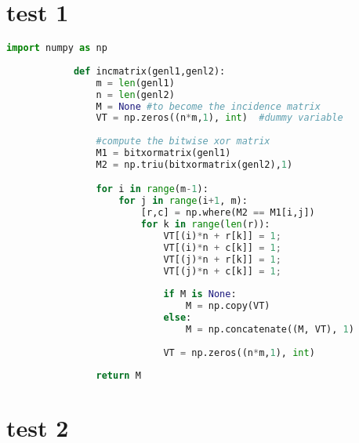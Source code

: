 \usepackage{listings}


	\usepackage{listings}
	\usepackage{color}





	\lstlistoflisting


	\section{test 1}

		\begin{lstlisting}[language=Python, caption=Python example]
			import numpy as np
				
			def incmatrix(genl1,genl2):
				m = len(genl1)
				n = len(genl2)
				M = None #to become the incidence matrix
				VT = np.zeros((n*m,1), int)  #dummy variable
				
				#compute the bitwise xor matrix
				M1 = bitxormatrix(genl1)
				M2 = np.triu(bitxormatrix(genl2),1) 

				for i in range(m-1):
					for j in range(i+1, m):
						[r,c] = np.where(M2 == M1[i,j])
						for k in range(len(r)):
							VT[(i)*n + r[k]] = 1;
							VT[(i)*n + c[k]] = 1;
							VT[(j)*n + r[k]] = 1;
							VT[(j)*n + c[k]] = 1;
							
							if M is None:
								M = np.copy(VT)
							else:
								M = np.concatenate((M, VT), 1)
							
							VT = np.zeros((n*m,1), int)
				
				return M
		\end{lstlisting}

	\section{test 2}

